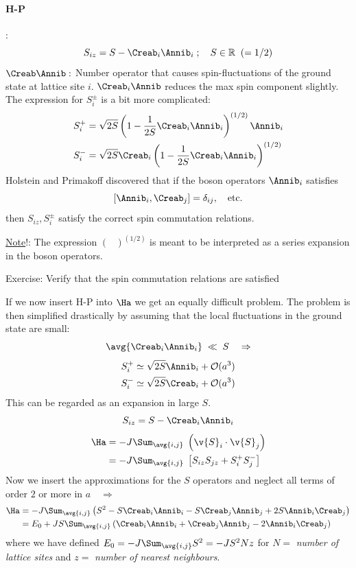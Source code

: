 \paragraph{H-P}:\hspace{0pt}
\[S_{iz} = S-\Creab_i\Annib_i\;;\quad S\in\mathbb{R} \;\;(=1/2)\]
$\Creab\Annib:$ Number operator that causes spin-fluctuations of the ground state at lattice site $i$. $\Creab_i\Annib$ reduces the max spin component slightly.
The expression for $S_i^\pm$ is a bit more complicated:
\[
  \begin{aligned}
	S_i^+ &= \sqrt{2S}\left( 1-\frac{1}{2S}\Creab_i\Annib_i \right)^{(1/2)}\Annib_i\\
	S_i^- &= \sqrt{2S}\Creab_i\left( 1- \frac{1}{2S}\Creab_i\Annib_i \right)^{(1/2)}
  \end{aligned}
\]
Holstein and Primakoff discovered that if the boson operators $\Annib_i$ satisfies
\[ \left[ \Annib_i,\Creab_j \right] = \delta_{ij},\quad\text{etc.}\]
then $S_{iz}, S_i^\pm$ satisfy the correct spin commutation relations.

\underline{Note}!: The expression $(\hspace{9pt})^{(1/2)}$ is meant to be interpreted as a series expansion in the boson operators.

\begin{Indentskip}
  Exercise: Verify that the spin commutation relations are satisfied
\end{Indentskip}

If we now insert H-P into $\Ha$ we get an equally difficult problem. The problem is then simplified drastically by assuming that the local fluctuations in the ground state are small:
\[\avg{\Creab_i\Annib_i}\;\ll\;S \quad\Rightarrow\]
\[
  \begin{aligned}
	S_i^+ &\simeq \sqrt{2S}\Annib_i + \mathcal{O}(a^3)\\
	S_i^- &\simeq \sqrt{2S}\Creab_i + \mathcal{O}(a^3)
  \end{aligned}
\]
This can be regarded as an expansion in large $S$.
\[S_{iz} = S - \Creab_i\Annib_i\]
\begin{align*}
  \Ha &= -J\Sum_{\avg{i,j}}\;\left( \v{S}_i\cdot\v{S}_j \right)\\
  &= -J\Sum_{\avg{i,j}}\;\left[ S_{iz}S_{jz} + S_i^+S_j^- \right]
\end{align*}
Now we insert the approximations for the $S$ operators and neglect all terms of order $2$ or more in $a\quad\Rightarrow$
\begin{align*}
  \Ha &= -J\Sum_{\avg{i,j}}\left( S^2 - S\Creab_i\Annib_i - S\Creab_j\Annib_j + 2S\Annib_i\Creab_j \right)\\
  &= E_0 + JS\Sum_{\avg{i,j}}\left( \Creab_i\Annib_i + \Creab_j\Annib_j - 2\Annib_i\Creab_j \right)
\end{align*}
where we have defined $E_0 = -J\Sum_{\avg{i,j}}S^2 = -JS^2Nz$ for $N = $ \emph{number of lattice sites} and $z = $ \emph{number of nearest neighbours}.

